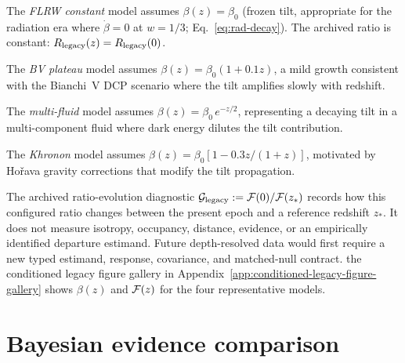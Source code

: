 The \emph{FLRW constant} model assumes $\beta(z) = \beta_0$
(frozen tilt, appropriate for the radiation era where
$\dot{\beta} = 0$ at $w = 1/3$; Eq.~\eqref{eq:rad-decay}).
The archived ratio is constant:
$R_{\rm legacy}(z)=R_{\rm legacy}(0)$.

The \emph{BV plateau} model assumes
$\beta(z) = \beta_0(1 + 0.1z)$, a mild growth consistent with
the Bianchi~V DCP scenario where the tilt amplifies slowly
with redshift.

The \emph{multi-fluid} model assumes
$\beta(z) = \beta_0\,e^{-z/2}$, representing a decaying tilt
in a multi-component fluid where dark energy dilutes the tilt
contribution.

The \emph{Khronon} model assumes
$\beta(z) = \beta_0[1 - 0.3z/(1+z)]$, motivated by
Ho\v{r}ava gravity corrections that modify the tilt propagation.

The archived ratio-evolution diagnostic
$\mathcal{G}_{\rm legacy}:=\mathcal{F}(0)/\mathcal{F}(z_*)$ records how this
configured ratio changes between the present epoch and a reference
redshift $z_*$.  It does not measure isotropy, occupancy, distance,
evidence, or an empirically identified departure estimand.  Future
depth-resolved data would first require a new typed estimand,
response, covariance, and matched-null contract.
the conditioned legacy figure gallery in Appendix~\ref{app:conditioned-legacy-figure-gallery} shows $\beta(z)$ and
$\mathcal{F}(z)$ for the four representative models.


\section{Bayesian evidence comparison}\label{sec:evidence}
\label{ch:evidence}

\begin{center}
\end{center}

